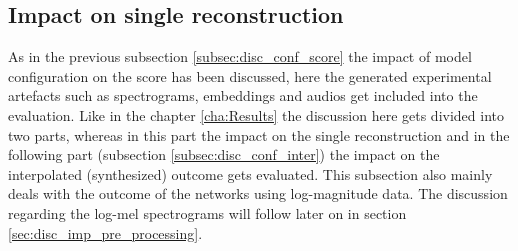 \subsection{Impact on single reconstruction}
\label{subsec:disc_conf_single_rec}
As in the previous subsection \ref{subsec:disc_conf_score} the impact of model configuration on the score has been discussed, here the generated experimental artefacts such as spectrograms, embeddings and audios get included into the evaluation. Like in the chapter \ref{cha:Results} the discussion here gets divided into two parts, whereas in this part the impact on the single reconstruction and in the following part (subsection \ref{subsec:disc_conf_inter}) the impact on the interpolated (synthesized) outcome gets evaluated. 
This subsection also mainly deals with the outcome of the networks using log-magnitude data. The discussion regarding the log-mel spectrograms will follow later on in section \ref{sec:disc_imp_pre_processing}.



